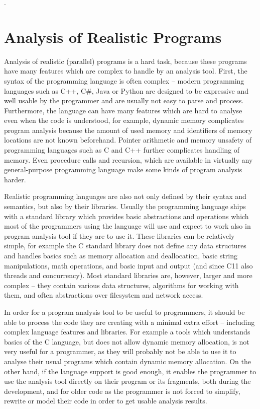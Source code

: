 .

\section{Analysis of Realistic Programs}

Analysis of realistic (parallel) programs is a hard task, because these programs have many features which are complex to handle by an analysis tool.
First, the syntax of the programming language is often complex -- modern programming languages such as C++, C\#, Java or Python are designed to be expressive and well usable by the programmer and are usually not easy to parse and process.
Furthermore, the language can have many features which are hard to analyse even when the code is understood, for example, dynamic memory complicates program analysis because the amount of used memory and identifiers of memory locations are not known beforehand.
Pointer arithmetic and memory unsafety of programming languages such as C and C++ further complicates handling of memory.
Even procedure calls and recursion, which are available in virtually any general-purpose programming language make some kinds of program analysis harder.

Realistic programming languages are also not only defined by their syntax and semantics, but also by their libraries.
Usually the programming language ships with a standard library which provides basic abstractions and operations which most of the programmers using the language will use and expect to work also in program analysis tool if they are to use it.
These libraries can be relatively simple, for example the C standard library does not define any data structures and handles basics such as memory allocation and deallocation, basic string manipulations, math operations, and basic input and output (and since C11 also threads and concurrency).
Most standard libraries are, however, larger and more complex -- they contain various data structures, algorithms for working with them, and often abstractions over filesystem and network access.

In order for a program analysis tool to be useful to programmers, it should be able to process the code they are creating with a minimal extra effort -- including complex language features and libraries.
For example a tools which understands basics of the C language, but does not allow dynamic memory allocation, is not very useful for a programmer, as they will probably not be able to  use it to analyse their usual programs which contain dynamic memory allocation.
On the other hand, if the language support is good enough, it enables the programmer to use the analysis tool directly on their program or its fragments, both during the development, and for older code as the programmer is not forced to simplify, rewrite or model their code in order to get usable analysis results.

